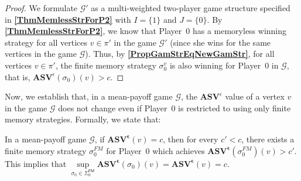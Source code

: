 \begin{proof}
We formulate $\mathcal{G'}$ as a multi-weighted two-player game structure specified in \textbf{\cref{ThmMemlessStrForP2}} with $I = \{1\}$ and $J = \{0\}$. By \textbf{\cref{ThmMemlessStrForP2}}, we know that Player~0 has a memoryless winning strategy for all vertices $v \in \pi'$ in the game $\mathcal{G'}$ (since she wins for the same vertices in the game $\mathcal{G}$).
Thus, by \textbf{\cref{PropGamStrEqNewGamStr}}, for all vertices $v \in \pi'$, the finite memory strategy $\sigma_0^v$ is also winning for Player~0 in $\mathcal{G}$, that is, $\mathbf{ASV}^{\epsilon}(\sigma_0)(v) > c$.
\end{proof}

Now, we establish that, in a mean-payoff game $\mathcal{G}$, the $\mathbf{ASV}^{\epsilon}$ value of a vertex $v$ in the game $\mathcal{G}$ does not change even if Player~0 is restricted to using only finite memory strategies. Formally, we state that:

\begin{corollary}
\label{CorASVEqASVFin}
In a mean-payoff game $\mathcal{G}$, if $\mathbf{ASV^{\epsilon}}(v) = c$, then for every $c' < c$, there exists a finite memory strategy $\sigma_0^{FM}$ for Player~0 which achieves $\mathbf{ASV^{\epsilon}}(\sigma_0^{FM})(v) > c'$. This implies that $\sup\limits_{\sigma_0 \in \Sigma_0^{\mathsf{FM}}} \mathbf{ASV^{\epsilon}}(\sigma_0)(v) = \mathbf{ASV^{\epsilon}}(v) = c$.
\end{corollary}